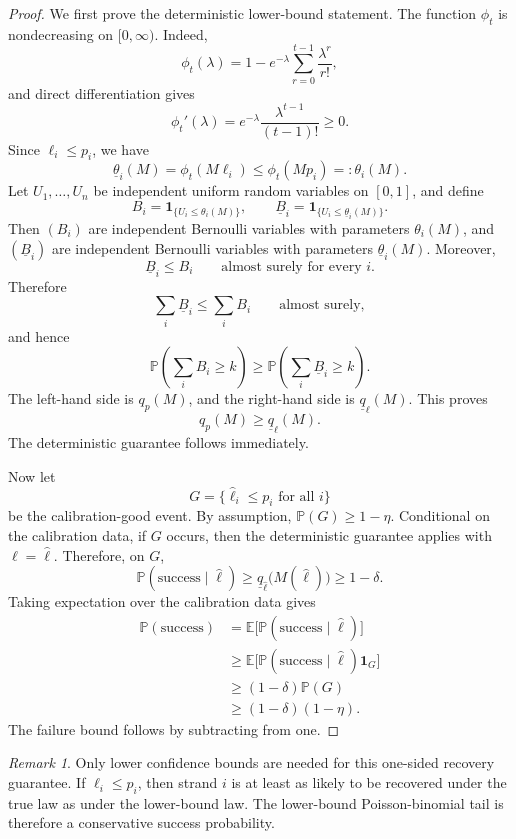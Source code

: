 \documentclass[11pt]{article}
\theoremstyle{definition}
\theoremstyle{remark}
\newtheorem{remark}{Remark}
\newcommand{\E}{\mathbb E}
\newcommand{\Pbb}{\mathbb P}
\newcommand{\1}{\mathbf 1}
\begin{document}
\begin{proof}
We first prove the deterministic lower-bound statement.  The function \(\phi_t\) is nondecreasing on \([0,\infty)\).  Indeed,
\[
  \phi_t(\lambda)=1-e^{-\lambda}\sum_{r=0}^{t-1}\frac{\lambda^r}{r!},
\]
and direct differentiation gives
\[
  \phi_t'(\lambda)=e^{-\lambda}\frac{\lambda^{t-1}}{(t-1)!}\ge 0.
\]
Since \(\ell_i\le p_i\), we have
\[
  \underline\theta_i(M)=\phi_t(M\ell_i)\le \phi_t(Mp_i)=:\theta_i(M).
\]
Let \(U_1,\ldots,U_n\) be independent uniform random variables on \([0,1]\), and define
\[
  B_i=\1_{\{U_i\le \theta_i(M)\}},\qquad
  \underline B_i=\1_{\{U_i\le \underline\theta_i(M)\}}.
\]
Then \((B_i)\) are independent Bernoulli variables with parameters \(\theta_i(M)\), and \((\underline B_i)\) are independent Bernoulli variables with parameters \(\underline\theta_i(M)\).  Moreover,
\[
  \underline B_i\le B_i\qquad\text{almost surely for every }i.
\]
Therefore
\[
  \sum_i \underline B_i\le \sum_i B_i\qquad\text{almost surely},
\]
and hence
\[
  \Pbb\left(\sum_i B_i\ge k\right)
  \ge
  \Pbb\left(\sum_i \underline B_i\ge k\right).
\]
The left-hand side is \(q_p(M)\), and the right-hand side is \(\underline q_\ell(M)\).  This proves
\[
  q_p(M)\ge \underline q_\ell(M).
\]
The deterministic guarantee follows immediately.

Now let
\[
  G=\{\widehat\ell_i\le p_i\text{ for all }i\}
\]
be the calibration-good event.  By assumption, \(\Pbb(G)\ge1-\eta\).  Conditional on the calibration data, if \(G\) occurs, then the deterministic guarantee applies with \(\ell=\widehat\ell\).  Therefore, on \(G\),
\[
  \Pbb(\mathrm{success}\mid \widehat\ell)
  \ge
  \underline q_{\widehat\ell}\bigl(M(\widehat\ell)\bigr)
  \ge 1-\delta.
\]
Taking expectation over the calibration data gives
\[
\begin{aligned}
  \Pbb(\mathrm{success})
  &=\E\bigl[\Pbb(\mathrm{success}\mid \widehat\ell)\bigr] \\
  &\ge \E\bigl[\Pbb(\mathrm{success}\mid \widehat\ell)\1_G\bigr] \\
  &\ge (1-\delta)\Pbb(G) \\
  &\ge (1-\delta)(1-\eta).
\end{aligned}
\]
The failure bound follows by subtracting from one.
\end{proof}

\begin{remark}
Only lower confidence bounds are needed for this one-sided recovery guarantee.  If \(\ell_i\le p_i\), then strand \(i\) is at least as likely to be recovered under the true law as under the lower-bound law.  The lower-bound Poisson-binomial tail is therefore a conservative success probability.
\end{remark}
\end{document}
